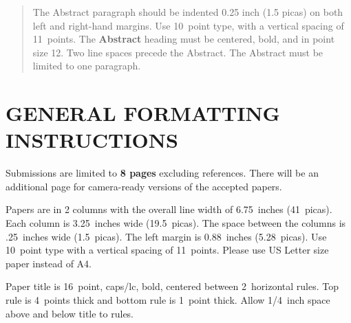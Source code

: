 \documentclass[twoside]{article}
\begin{document}
%

%


\begin{abstract}
  The Abstract paragraph should be indented 0.25 inch (1.5 picas) on
  both left and right-hand margins. Use 10~point type, with a vertical
  spacing of 11~points. The \textbf{Abstract} heading must be centered,
  bold, and in point size 12. Two line spaces precede the
  Abstract. The Abstract must be limited to one paragraph.
\end{abstract}

\section{GENERAL FORMATTING INSTRUCTIONS}

Submissions are limited to \textbf{8 pages} excluding references. 
There will be an additional page for camera-ready versions of the accepted papers.

Papers are in 2 columns with the overall line width of 6.75~inches (41~picas).
Each column is 3.25~inches wide (19.5~picas).  The space
between the columns is .25~inches wide (1.5~picas).  The left margin is 0.88~inches (5.28~picas).
Use 10~point type with a vertical spacing of
11~points. Please use US Letter size paper instead of A4.

Paper title is 16~point, caps/lc, bold, centered between 2~horizontal rules.
Top rule is 4~points thick and bottom rule is 1~point thick.
Allow 1/4~inch space above and below title to rules.
\end{document}
